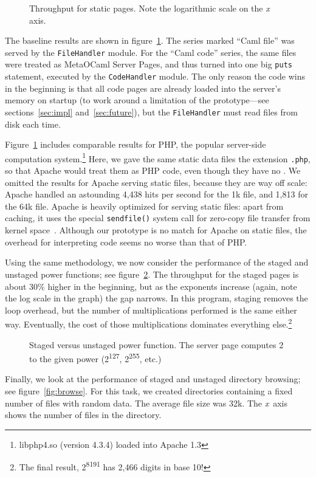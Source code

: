 \documentclass[preprint]{acm_proc_article-sp}
\def\MOC{MetaOCaml\xspace}
\newcommand{\myfig}[3]{%
  \begin{figure}[tbp]%
    #3%
    \caption{#2}%
    \label{fig:#1}%
  \end{figure}}
\newcommand{\gnuplot}[2]{%
  \myfig{#1}{#2}{}}
\begin{document}
\gnuplot{static}{Throughput for static pages.  Note the logarithmic
  scale on the \textit x axis.}

The baseline results are shown in figure~\ref{fig:static}.  The
series marked “Caml file” was served by the \texttt{FileHandler}
module.  For the “Caml code” series, the same files were treated
as \MOC{} Server Pages, and thus turned into one big
\texttt{puts} statement, executed by the \texttt{CodeHandler}
module.  The only reason the code wins in the beginning is that
all code pages are already loaded into the server’s memory on
startup (to work around a limitation of the prototype---see
sections~\ref{sec:impl} and~\ref{sec:future}), but the
\texttt{FileHandler} must read files from disk each time.

Figure~\ref{fig:static} includes comparable results for PHP, the
popular server-side computation system.\footnote{libphp4.so
  (version 4.3.4) loaded into Apache 1.3} Here, we gave the same
static data files the extension \texttt{.php}, so that Apache
would treat them as PHP code, even though they have no
.
We omitted the results for Apache serving static files, because they
are way off scale: Apache handled an astounding 4,438 hits per second
for the 1k file, and 1,813 for the 64k file.  Apache is heavily
optimized for serving static files: apart from caching, it uses the
special \texttt{sendfile()} system call for zero-copy file transfer
from kernel space~\cite{tranter03sendfile}.  Although our prototype is
no match for Apache on static files, the overhead for interpreting
code seems no worse than that of PHP.

Using the same methodology, we now consider the performance of
the staged and unstaged power functions; see
figure~\ref{fig:power}.  The throughput for the staged pages is
about 30\% higher in the beginning, but as the exponents
increase (again, note the log scale in the graph) the gap
narrows.  In this program, staging removes the loop overhead,
but the number of multiplications performed is the same either
way.  Eventually, the cost of those multiplications dominates
everything else.\footnote{The final result,
  2\textsuperscript{8191} has 2,466 digits in base 10!}

\gnuplot{power}{Staged versus unstaged power function.  The
  server page computes 2 to the given power
  (2\textsuperscript{127}, 2\textsuperscript{255}, etc.)}

Finally, we look at the performance of staged and unstaged
directory browsing; see figure~\ref{fig:browse}.  For this task,
we created directories containing a fixed number of files with
random data.  The average file size was 32k.  The \emph{x}~axis
shows the number of files in the directory.  
\end{document}

